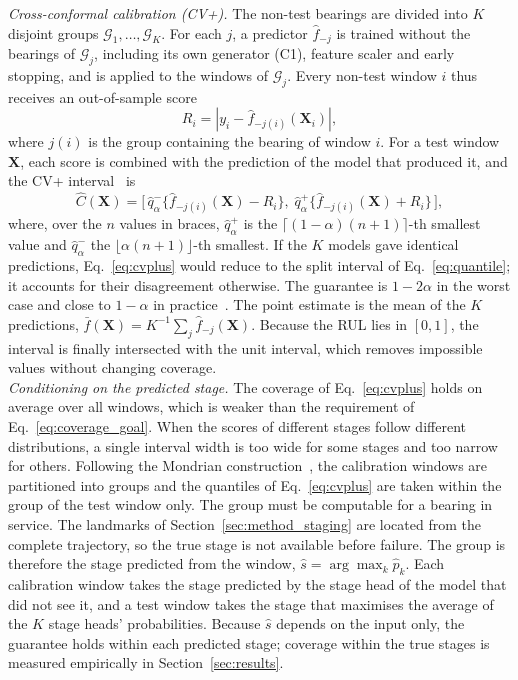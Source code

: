 \documentclass[review]{elsarticle}
\begin{document}
\textit{Cross-conformal calibration (CV+).} The non-test bearings are
divided into $K$ disjoint groups $\mathcal{G}_1, \dots, \mathcal{G}_K$.
For each $j$, a predictor $\hat{f}_{-j}$ is trained without the
bearings of $\mathcal{G}_j$, including its own generator (C1), feature
scaler and early stopping, and is applied to the windows of
$\mathcal{G}_j$. Every non-test window $i$ thus receives an
out-of-sample score
\begin{equation}
  R_i = \left| y_i - \hat{f}_{-j(i)}(\mathbf{X}_i) \right|,
  \label{eq:oof_score}
\end{equation}
where $j(i)$ is the group containing the bearing of window $i$. For a
test window $\mathbf{X}$, each score is combined with the prediction of
the model that produced it, and the CV+
interval~\cite{barber2021jackknife} is
\begin{equation}
  \hat{C}(\mathbf{X}) = \Big[\,
  \hat{q}^{-}_{\alpha}\big\{ \hat{f}_{-j(i)}(\mathbf{X}) - R_i \big\},\;
  \hat{q}^{+}_{\alpha}\big\{ \hat{f}_{-j(i)}(\mathbf{X}) + R_i \big\}
  \,\Big],
  \label{eq:cvplus}
\end{equation}
where, over the $n$ values in braces, $\hat{q}^{+}_{\alpha}$ is the
$\lceil (1-\alpha)(n+1) \rceil$-th smallest value and
$\hat{q}^{-}_{\alpha}$ the $\lfloor \alpha (n+1) \rfloor$-th smallest.
If the $K$ models gave identical predictions, Eq.~\eqref{eq:cvplus}
would reduce to the split interval of Eq.~\eqref{eq:quantile}; it
accounts for their disagreement otherwise. The guarantee is
$1 - 2\alpha$ in the worst case and close to $1 - \alpha$ in
practice~\cite{barber2021jackknife}. The point estimate is the mean of
the $K$ predictions, $\bar{f}(\mathbf{X}) = K^{-1}\sum_j
\hat{f}_{-j}(\mathbf{X})$. Because the RUL lies in $[0,1]$, the
interval is finally intersected with the unit interval, which removes
impossible values without changing coverage.\\

\textit{Conditioning on the predicted stage.} The coverage of
Eq.~\eqref{eq:cvplus} holds on average over all windows, which is
weaker than the requirement of Eq.~\eqref{eq:coverage_goal}. When the
scores of different stages follow different distributions, a single
interval width is too wide for some stages and too narrow for others.
Following the Mondrian construction~\cite{vovk2005algorithmic}, the
calibration windows are partitioned into groups and the quantiles of
Eq.~\eqref{eq:cvplus} are taken within the group of the test window
only. The group must be computable for a bearing in service. The
landmarks of Section~\ref{sec:method_staging} are located from the
complete trajectory, so the true stage is not available before failure.
The group is therefore the stage predicted from the window,
$\hat{s} = \arg\max_k \hat{p}_k$. Each calibration window takes the
stage predicted by the stage head of the model that did not see it,
and a test window takes the stage that maximises the average of the
$K$ stage heads' probabilities. Because $\hat{s}$ depends on the input
only, the guarantee holds within each predicted stage; coverage within
the true stages is measured empirically in Section~\ref{sec:results}.\\
\end{document}
